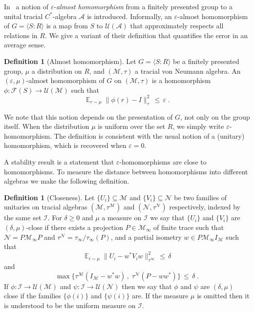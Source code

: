 \documentclass[11pt]{article}
\theoremstyle{definition}
\newtheorem{definition}[theorem]{Definition}
\newcommand{\Id}{\ensuremath{I}}
\DeclareMathOperator*{\Expectation}{\mathbb{E}}
\newcommand{\Es}[1]{\Expectation_{#1}}
\newcommand{\mA}{\ensuremath{\mathcal{A}}}
\newcommand{\mF}{\ensuremath{\mathcal{F}}}
\newcommand{\mM}{\ensuremath{\mathcal{M}}}
\newcommand{\mI}{\ensuremath{\mathcal{I}}}
\newcommand{\mU}{\ensuremath{\mathcal{U}}}
\newcommand{\eps}{\varepsilon}
\newcommand{\mN}{\mathcal{N}}
\begin{document}
In~\cite[Section 2]{hadwin2018stability} a notion of $\eps$-\emph{almost homomorphism} from a finitely presented group to a unital tracial $C^*$-algebra $\mA$ is introduced. Informally, an $\eps$-almost homomorphism of $G=\langle S:R\rangle$ is a map from $S$ to $\mU(\mA)$ that approximately respects all relations in $R$. We give a variant of their definition that quantifies the error in an average sense. 

\begin{definition}[Almost homomorphism]
Let $G = \langle S:R\rangle $ be a finitely presented group, $\mu$ a distribution on $R$, and $(\mM,\tau)$ a tracial von Neumann algebra. An $(\eps,\mu)$-almost homomorphism of $G$ on $(\mM,\tau)$ is a homomorphism $\phi:\mF(S)\to\mU(\mM)$  such that
\[ \Es{r\sim \mu} \big\|  \phi(r) - \Id \big \|_\tau^2 \,\leq\, \eps\;.\]
\end{definition}

We note that this notion depends on the presentation of $G$, not only on the group itself. 
When the distribution $\mu$ is uniform over the set $R$, we simply write $\eps$-homomorphism. The definition is consistent with the usual notion of a (unitary) homomorphism, which is recovered when $\eps=0$. 

A stability result is a statement that $\eps$-homomorphisms are close to homomorphisms. To measure the distance between homomorphisms into different algebras we make the following definition. 


\begin{definition}[Closeness]\label{def:close}
Let $\{U_i\}\subseteq \mM$ and $\{V_i\}\subseteq \mN$ be two families of unitaries on  tracial algebras $(\mM,\tau^\mM)$ and $(\mN,\tau^\mN)$ respectively, indexed by the same set $\mI$. For $\delta\geq0$ and $\mu$ a measure on $\mI$ we say that $\{U_i\}$ and $\{V_i\}$ are $(\delta,\mu)$-close if there exists a projection $P\in\mM_\infty$ of finite trace such that $\mN=P\mM_\infty P$ and $\tau^\mN=\tau_\infty/\tau_\infty(P)$, and a partial isometry $w\in P \mM_\infty \Id_\mM$ such that 
\[ \Es{i\sim\mu} \big\| U_i - w^* V_i w \big\|_{\tau^\mM}^2 \,\leq\,\delta\]
and 
\[\max\big\{ \tau^\mM(\Id_\mM-w^*w)\,,\; \tau^\mN(P-ww^*)\big\} \,\leq\, \delta\;.\]
If $\phi:\mI\to \mU(\mM)$ and $\psi:\mI\to \mU(\mN)$ then we say that $\phi$ and $\psi$ are $(\delta,\mu)$ close if the families $\{\phi(i)\}$ and $\{\psi(i)\}$ are. 
If the measure $\mu$ is omitted then it is understood to be the uniform measure on $\mI$.
\end{definition}
\end{document}

